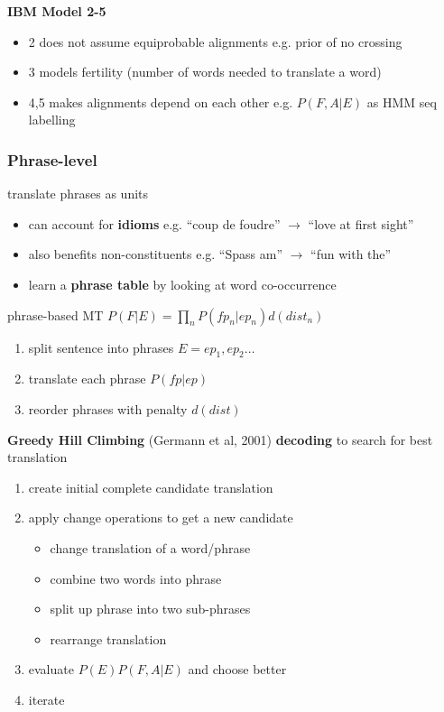 \documentclass[]{article}
\theoremstyle{definition}
\begin{document}
\textbf{IBM Model 2-5}
\begin{itemize}
    \item 2 does not assume equiprobable alignments e.g. prior of no crossing
    \item 3 models fertility (number of words needed to translate a word)
    \item 4,5 makes alignments depend on each other e.g. $P(F,A|E)$ as HMM seq labelling
\end{itemize}

\subsubsection{Phrase-level}%
\label{ssub:phrase_level}

translate phrases as units
\begin{itemize}
    \item can account for \textbf{idioms} e.g. ``coup de foudre'' $\to$ ``love at first sight''
    \item also benefits non-constituents e.g. ``Spass am'' $\to$ ``fun with the''
    \item learn a \textbf{phrase table} by looking at word co-occurrence
\end{itemize}

phrase-based MT $P(F|E) = \prod_n P(fp_n|ep_n) d(dist_n)$
\begin{enumerate}
    \item split sentence into phrases $E = ep_1,ep_2 \ldots$
    \item translate each phrase $P(fp | ep)$
    \item reorder phrases with penalty $d(dist)$
\end{enumerate}

\textbf{Greedy Hill Climbing} (Germann et al, 2001) \textbf{decoding} to search for best translation
\begin{enumerate}
    \item create initial complete candidate translation
    \item apply change operations to get a new candidate
        \begin{itemize}
            \item change translation of a word/phrase
            \item combine two words into phrase
            \item split up phrase into two sub-phrases
            \item rearrange translation
        \end{itemize}
    \item evaluate $P(E)P(F,A|E)$ and choose better
    \item iterate
\end{enumerate}
\end{document}
